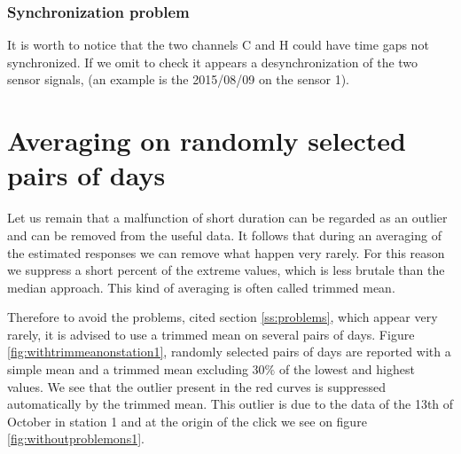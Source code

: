 

\newpage\clearpage
\subsubsection{Synchronization problem}
It is worth to notice that the two channels C and H could have time gaps not synchronized. If we omit to check it appears a desynchronization of the two sensor signals, (an example is the 2015/08/09 on the sensor 1). 

%
%
\section{Averaging on randomly selected pairs of days}


Let us remain that a malfunction of short duration can be regarded as an outlier and can be removed from the useful data. It follows that during an averaging of the estimated responses we can remove what happen very rarely. For this reason we suppress a short percent of the extreme values, which is less brutale than the median approach. This kind of averaging is often called trimmed mean.

Therefore to avoid the problems, cited section \ref{ss:problems}, which appear very rarely, it is advised to use a trimmed mean on several pairs of days. Figure \ref{fig:withtrimmeanonstation1}, randomly selected pairs of days are reported with a simple mean 
and a trimmed mean excluding $30\%$ of the lowest and highest values. We see that the outlier present in the red curves is suppressed automatically by the trimmed mean. This outlier is due to the data of the 13th of October in station 1 and at the origin of the click we see on figure \ref{fig:withoutproblemons1}.   


